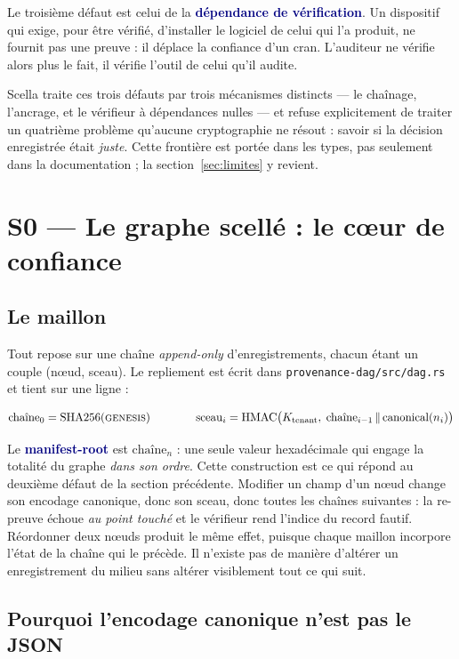 \documentclass[10pt]{article}
\newcommand{\code}[1]{\texttt{\small #1}}
\newcommand{\mm}[1]{\textbf{\textcolor{navy}{#1}}}
\begin{document}
Le troisième défaut est celui de la \mm{dépendance de vérification}. Un dispositif qui exige, pour être vérifié, d'installer le logiciel de celui qui l'a produit, ne fournit pas une preuve : il déplace la confiance d'un cran. L'auditeur ne vérifie alors plus le fait, il vérifie l'outil de celui qu'il audite.

Scella traite ces trois défauts par trois mécanismes distincts — le chaînage, l'ancrage, et le vérifieur à dépendances nulles — et refuse explicitement de traiter un quatrième problème qu'aucune cryptographie ne résout : savoir si la décision enregistrée était \emph{juste}. Cette frontière est portée dans les types, pas seulement dans la documentation ; la section~\ref{sec:limites} y revient.

\section{S0 — Le graphe scellé : le cœur de confiance}

\subsection{Le maillon}

Tout repose sur une chaîne \emph{append-only} d'enregistrements, chacun étant un couple (nœud, sceau). Le repliement est écrit dans \code{provenance-dag/src/dag.rs} et tient sur une ligne :
\begin{extrait}
\[ \text{cha\^ine}_0 = \mathrm{SHA256}(\textsc{genesis}) \qquad\qquad \text{sceau}_i = \mathrm{HMAC}\bigl(K_{\text{tenant}},\; \text{cha\^ine}_{i-1} \,\Vert\, \mathrm{canonical}(n_i)\bigr) \]
\end{extrait}
Le \mm{manifest-root} est $\text{cha\^ine}_n$ : une seule valeur hexadécimale qui engage la totalité du graphe \emph{dans son ordre}. Cette construction est ce qui répond au deuxième défaut de la section précédente. Modifier un champ d'un nœud change son encodage canonique, donc son sceau, donc toutes les chaînes suivantes : la re-preuve échoue \emph{au point touché} et le vérifieur rend l'indice du record fautif. Réordonner deux nœuds produit le même effet, puisque chaque maillon incorpore l'état de la chaîne qui le précède. Il n'existe pas de manière d'altérer un enregistrement du milieu sans altérer visiblement tout ce qui suit.

\subsection{Pourquoi l'encodage canonique n'est pas le JSON}
\end{document}

